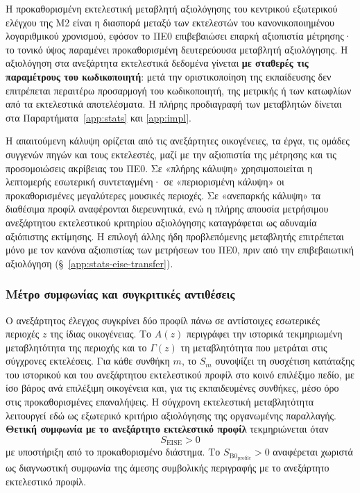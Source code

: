 \documentclass[11pt,a4paper]{article}
\begin{document}
Η προκαθορισμένη εκτελεστική μεταβλητή αξιολόγησης του κεντρικού εξωτερικού ελέγχου της M2 είναι η διασπορά μεταξύ των εκτελεστών του κανονικοποιημένου λογαριθμικού χρονισμού, εφόσον το ΠΕ0 επιβεβαιώσει επαρκή αξιοπιστία μέτρησης· το τονικό ύψος παραμένει προκαθορισμένη δευτερεύουσα μεταβλητή αξιολόγησης. Η αξιολόγηση στα ανεξάρτητα εκτελεστικά δεδομένα γίνεται \textbf{με σταθερές τις παραμέτρους του κωδικοποιητή}: μετά την οριστικοποίηση της εκπαίδευσης δεν επιτρέπεται περαιτέρω προσαρμογή του κωδικοποιητή, της μετρικής ή των κατωφλίων από τα εκτελεστικά αποτελέσματα. Η πλήρης προδιαγραφή των μεταβλητών δίνεται στα Παραρτήματα~\ref{app:stats} και \ref{app:impl}.

Η απαιτούμενη κάλυψη ορίζεται από τις ανεξάρτητες οικογένειες, τα έργα, τις ομάδες συγγενών πηγών και τους εκτελεστές, μαζί με την αξιοπιστία της μέτρησης και τις προσομοιώσεις ακρίβειας του ΠΕ0. Σε «πλήρης κάλυψη» χρησιμοποιείται η λεπτομερής εσωτερική συντεταγμένη· σε «περιορισμένη κάλυψη» οι προκαθορισμένες μεγαλύτερες μουσικές περιοχές. Σε «ανεπαρκής κάλυψη» τα διαθέσιμα προφίλ αναφέρονται διερευνητικά, ενώ η πλήρης απουσία μετρήσιμου ανεξάρτητου εκτελεστικού κριτηρίου αξιολόγησης καταγράφεται ως αδυναμία αξιόπιστης εκτίμησης. Η επιλογή άλλης ήδη προβλεπόμενης μεταβλητής επιτρέπεται μόνο με τον κανόνα αξιοπιστίας των μετρήσεων του ΠΕ0, πριν από την επιβεβαιωτική αξιολόγηση (§~\ref{app:stats-eise-transfer}).

\subsubsection{Μέτρο συμφωνίας και συγκριτικές αντιθέσεις}

Ο ανεξάρτητος έλεγχος συγκρίνει δύο προφίλ πάνω σε αντίστοιχες εσωτερικές περιοχές $z$ της ίδιας οικογένειας. Το $A(z)$ περιγράφει την ιστορικά τεκμηριωμένη μεταβλητότητα της περιοχής και το $\Gamma(z)$ τη μεταβλητότητα που μετράται στις σύγχρονες εκτελέσεις. Για κάθε συνθήκη $m$, το $S_m$ συνοψίζει τη συσχέτιση κατάταξης του ιστορικού και του ανεξάρτητου εκτελεστικού προφίλ στο κοινό επιλέξιμο πεδίο, με ίσο βάρος ανά επιλέξιμη οικογένεια και, για τις εκπαιδευμένες συνθήκες, μέσο όρο στις προκαθορισμένες επαναλήψεις. Η σύγχρονη εκτελεστική μεταβλητότητα λειτουργεί εδώ ως εξωτερικό κριτήριο αξιολόγησης της οργανωμένης παραλλαγής. \textbf{Θετική συμφωνία με το ανεξάρτητο εκτελεστικό προφίλ} τεκμηριώνεται όταν
\[
S_{\mathrm{EISE}}>0
\]
με υποστήριξη από το προκαθορισμένο διάστημα. Το $S_{\mathrm{B0}_{\mathrm{profile}}}>0$ αναφέρεται χωριστά ως διαγνωστική συμφωνία της άμεσης συμβολικής περιγραφής με το ανεξάρτητο εκτελεστικό προφίλ.
\end{document}
